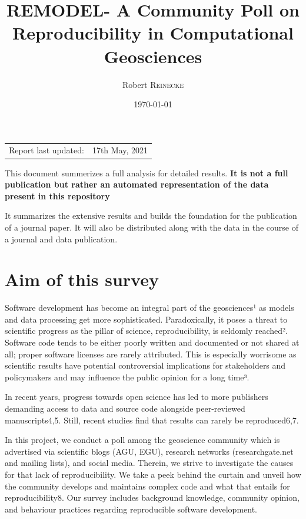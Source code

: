 \documentclass{article}
\title{REMODEL- A Community Poll on Reproducibility in Computational Geosciences} %
\author{Robert \textsc{Reinecke}} %
\date{\today} %
\begin{document}
\maketitle %

\begin{center}
\begin{tabular}{l r}
Report last updated: & 17th May, 2021 \\ %
\end{tabular}
\end{center}

This document summerizes a full analysis for detailed results. \textbf{It is not a full publication but rather an automated representation of the data present in this repository}

It summarizes the extensive results and builds the foundation for the publication of a journal paper.
It will also be distributed along with the data in the course of a journal and data publication.

\section{Aim of this survey}
Software development has become an integral part of the geosciences¹ as models and data processing get more sophisticated. Paradoxically, it poses a threat to scientific progress as the pillar of science, reproducibility, is seldomly reached². Software code tends to be either poorly written and documented or not shared at all; proper software licenses are rarely attributed. This is especially worrisome as scientific results have potential controversial implications for stakeholders and policymakers and may influence the public opinion for a long time³.

In recent years, progress towards open science has led to more publishers demanding access to data and source code alongside peer-reviewed manuscripts4,5. Still, recent studies find that results can rarely be reproduced6,7.

In this project, we conduct a poll among the geoscience community which is advertised via scientific blogs (AGU, EGU), research networks (researchgate.net and mailing lists), and social media. Therein, we strive to investigate the causes for that lack of reproducibility. We take a peek behind the curtain and unveil how the community develops and maintains complex code and what that entails for reproducibility8. Our survey includes background knowledge, community opinion, and behaviour practices regarding reproducible software development.
\end{document}
